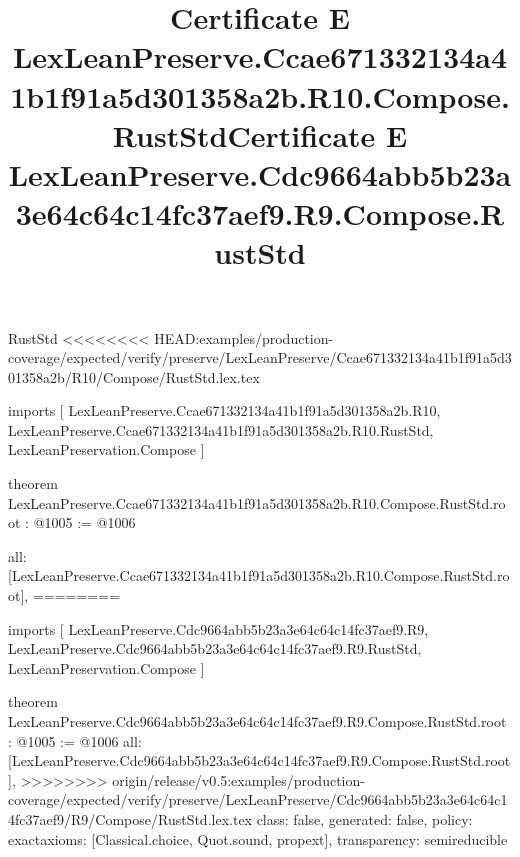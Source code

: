 \begin{lexlean}{RustStd}
<<<<<<<< HEAD:examples/production-coverage/expected/verify/preserve/LexLeanPreserve/Ccae671332134a41b1f91a5d301358a2b/R10/Compose/RustStd.lex.tex
\title{Certificate E LexLeanPreserve.Ccae671332134a41b1f91a5d301358a2b.R10.Compose.RustStd}
\begin{coremodule}
imports [
  LexLeanPreserve.Ccae671332134a41b1f91a5d301358a2b.R10,
  LexLeanPreserve.Ccae671332134a41b1f91a5d301358a2b.R10.RustStd,
  LexLeanPreservation.Compose
]

theorem LexLeanPreserve.Ccae671332134a41b1f91a5d301358a2b.R10.Compose.RustStd.root : @1005 := @1006 {
  all: [LexLeanPreserve.Ccae671332134a41b1f91a5d301358a2b.R10.Compose.RustStd.root],
========
\title{Certificate E LexLeanPreserve.Cdc9664abb5b23a3e64c64c14fc37aef9.R9.Compose.RustStd}
\begin{coremodule}
imports [
  LexLeanPreserve.Cdc9664abb5b23a3e64c64c14fc37aef9.R9,
  LexLeanPreserve.Cdc9664abb5b23a3e64c64c14fc37aef9.R9.RustStd,
  LexLeanPreservation.Compose
]

theorem LexLeanPreserve.Cdc9664abb5b23a3e64c64c14fc37aef9.R9.Compose.RustStd.root : @1005 := @1006 {
  all: [LexLeanPreserve.Cdc9664abb5b23a3e64c64c14fc37aef9.R9.Compose.RustStd.root],
>>>>>>>> origin/release/v0.5:examples/production-coverage/expected/verify/preserve/LexLeanPreserve/Cdc9664abb5b23a3e64c64c14fc37aef9/R9/Compose/RustStd.lex.tex
  class: false,
  generated: false,
  policy: exact{axioms: [Classical.choice, Quot.sound, propext]},
  transparency: semireducible
}


\end{coremodule}}
\end{coremodule}
\end{lexlean}
